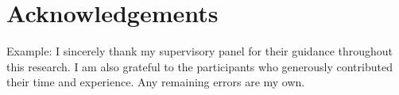 \chapter*{Acknowledgements}


Example: I sincerely thank my supervisory panel for their guidance throughout
this research. I am also grateful to the participants who generously contributed
their time and experience. Any remaining errors are my own.

